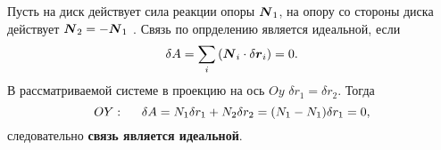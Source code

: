 \subsubsection*{}

Пусть на диск действует сила реакции опоры $\mbox{\boldmath $N$}_1$, на опору со стороны диска действует $\mbox{\boldmath $N$}_2 = - \mbox{\boldmath $N$}_1$ .  Связь по опрделению является идеальной, если
\begin{equation*}
    \delta A = \sum_i \left(
        \mbox{\boldmath $N$}_i \cdot \delta \mbox{\boldmath $r$}_i
    \right) = 0.
\end{equation*}
В рассматриваемой системе в проекцию на ось $Oy$  $\delta r_1 = \delta r_2$. Тогда
\begin{equation*}
    OY: \hspace{0.5cm} 
    \delta A = N_1 \delta r_1 + N_2 \delta r_2 = (N_1 - N_1) \delta r_1 = 0,
\end{equation*}
следовательно \textbf{связь является идеальной}.